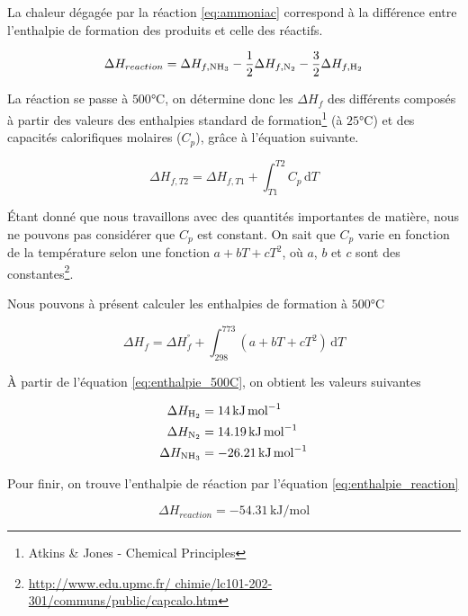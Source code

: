 \documentclass[a4paper, oneside, 12pt]{article}
\begin{document}
La chaleur dégagée par la réaction \ref{eq:ammoniac} correspond à la 
différence entre l'enthalpie de formation des produits et celle des réactifs. 

\begin{equation}
	\Delta H_{reaction} = \Delta H_{f, \ce{NH3}} 
	- \frac{1}{2} \Delta H_{f, \ce{N2}}
	- \frac{3}{2} \Delta H_{f, \ce{H2}}
	\label{eq:enthalpie_reaction}
\end{equation}

La réaction se passe à $500 \si{\degreeCelsius}$, 
on détermine donc les $\Delta H_{f}$ des différents 
composés à partir des valeurs des enthalpies standard
de formation\footnote{Atkins \& Jones - Chemical Principles}
(à $25 \si{\degreeCelsius}$)
et des capacités calorifiques molaires ($C_p$), gr\^ace 
à l'équation suivante.

\begin{equation*}
	\Delta H_{f, T2} = \Delta H_{f, T1} 
	+ \int_{T1}^{T2} C_p \, \mathrm{d}T
\end{equation*}

Étant donné que nous travaillons avec des quantités importantes de matière,
nous ne pouvons pas considérer que $C_p$ est constant.
On sait que $C_p$ varie en fonction de la température 
selon une fonction $a + b T + c T^2$, 
où $a$, $b$ et $c$ sont des constantes\footnote{\url{http://www.edu.upmc.fr/
chimie/lc101-202-301/communs/public/capcalo.htm}}. 

Nous pouvons à présent calculer les enthalpies 
de formation à $500 \si{\degreeCelsius}$

\begin{equation}
	\Delta H_f = \Delta H_{f}^{\si{\degree}} + 
	\int_{298}^{773} (a + b T + c T^2) \, \mathrm{d}T
	\label{eq:enthalpie_500C}
\end{equation}

À partir de l'équation \ref{eq:enthalpie_500C}, 
on obtient les valeurs suivantes

\begin{align*}
	\Delta H_{\ce{H2}} &= 14 \, \si{\kilo\joule\per\mole} \\
	\Delta H_{\ce{N2}} &= 14.19 \, \si{\kilo\joule\per\mole} \\
	\Delta H_{\ce{NH3}} &= -26.21 \, \si{\kilo\joule\per\mole} 
\end{align*}

Pour finir, on trouve l'enthalpie de réaction par l'équation \ref{eq:enthalpie_reaction}

\[
	\Delta H_{reaction} = -54.31 \, \si{\kilo\joule\per\mole}
\]
\end{document}
